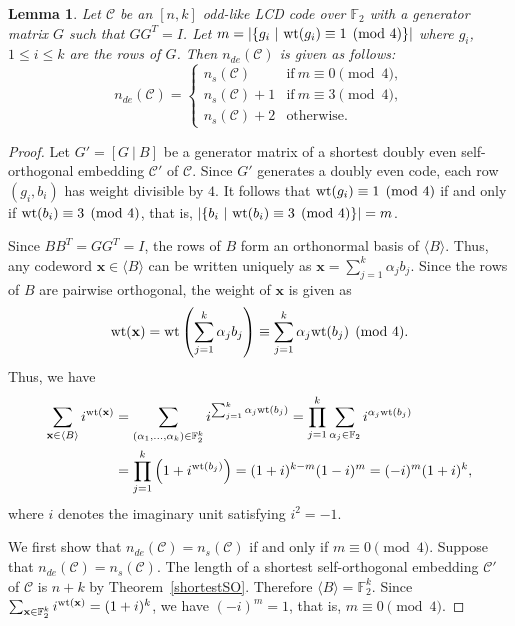 \documentclass{article}
\newtheorem{lemma}[theorem]{Lemma}
\theoremstyle{definition}
\theoremstyle{remark}
\begin{document}
\begin{lemma}\label{LCDdoublyevenembeddingodd}
    Let $\mathcal{C}$ be an $[n, k]$ odd-like LCD code over $\mathbb{F}_2$ with a generator matrix $G$ such that $GG^T=I$. Let $m=|\{g_i~|~{\rm{wt}}(g_i)\equiv1\pmod 4\}|$ where $g_i$, $1\le i\le k$ are the rows of $G$. Then $n_{de}(\mathcal{C})$ is given as follows:
    \[
    n_{de}(\mathcal{C})=\begin{cases}
        n_s(\mathcal{C}) & \mbox{if}~m\equiv 0\pmod 4,\\
        n_s(\mathcal{C})+1 & \mbox{if}~m\equiv 3\pmod 4,\\
        n_s(\mathcal{C})+2 & \mbox{otherwise}.
    \end{cases}
    \]
\end{lemma}
\begin{proof}
    Let $G'=[G~|~B]$ be a generator matrix of a shortest doubly even self-orthogonal embedding $\mathcal{C}'$ of $\mathcal{C}$. Since $G'$ generates a doubly even code, each row $(g_i, b_i)$ has weight divisible by $4$. It follows that ${\rm{wt}}(g_i)\equiv 1\pmod 4$ if and only if ${\rm{wt}}(b_i)\equiv 3\pmod 4$, that is, $|\{b_i~|~{\rm{wt}}(b_i)\equiv3\pmod 4\}|=m$. 

    Since $BB^T=GG^T=I$, the rows of $B$ form an orthonormal basis of $\langle B\rangle$. Thus, any codeword $\mathbf{x}\in\langle B\rangle$ can be written uniquely as $\mathbf{x}=\sum_{j=1}^k\alpha_jb_j$. Since the rows of $B$ are pairwise orthogonal, the weight of $\mathbf{x}$ is given as
    \[
    {\rm{wt}}(\mathbf{x})={\rm{wt}}\left(\sum_{j=1}^k\alpha_jb_j\right)\equiv\sum_{j=1}^k\alpha_j{\rm wt}(b_j)\pmod 4.
    \]
    Thus, we have
    \begin{align*}
    \sum_{\mathbf{x}\in\langle B\rangle} i^{{\rm{wt}}(\mathbf{x})}&=\sum_{(\alpha_1,\dots,\alpha_k)\in\mathbb F_2^k}i^{\sum_{j=1}^k \alpha_j{\rm wt}(b_j)}=\prod_{j=1}^k\sum_{\alpha_j\in\mathbb{F}_2}i^{\alpha_j{\rm wt}(b_j)}\\&=\prod_{j=1}^k\left(1+i^{{\rm wt}(b_j)}\right)=(1+i)^{k-m}(1-i)^m=(-i)^m(1+i)^k,
    \end{align*}
    where $i$ denotes the imaginary unit satisfying $i^2=-1$.

    We first show that $n_{de}(\mathcal{C})=n_s(\mathcal{C})$ if and only if $m\equiv 0\pmod 4$. Suppose that $n_{de}(\mathcal{C})=n_s(\mathcal{C})$. The length of a shortest self-orthogonal embedding $\mathcal{C}'$ of $\mathcal{C}$ is $n+k$ by Theorem~\ref{shortestSO}. Therefore $\langle B\rangle=\mathbb{F}_2^k$. Since $\sum_{\mathbf{x}\in\mathbb F_2^k} i^{{\rm{wt}}(\mathbf{x})}=(1+i)^k$, we have $(-i)^m=1$, that is, $m\equiv 0\pmod 4$.
    

\end{proof}
\end{document}
